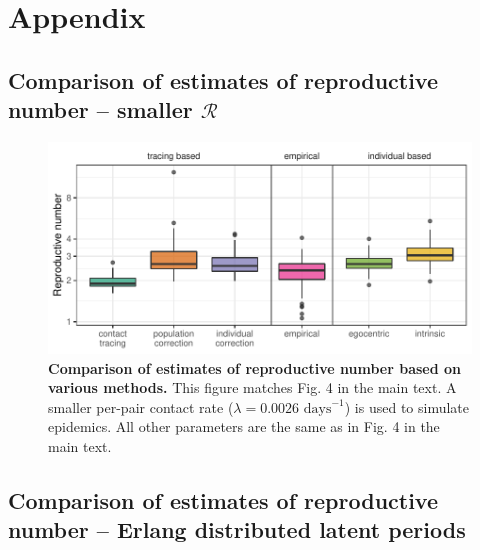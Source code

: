 \documentclass[12pt]{article}
\date{\today}
\newcommand{\RR}{\ensuremath{{\mathcal R}}}
\begin{document}
\appendix
\renewcommand\thefigure{\thesection.\arabic{figure}}
\setcounter{figure}{0}    
\section{Appendix}

\subsection{Comparison of estimates of reproductive number -- smaller $\RR$}

\begin{figure}[!h]
\includegraphics[width=\textwidth]{../fig/cmp_reproductive_small.pdf}
\caption{\textbf{Comparison of estimates of reproductive number based on various methods.}
This figure matches Fig. 4 in the main text.
A smaller per-pair contact rate ($\lambda = 0.0026 \textrm{ days}^{-1}$) is used to simulate epidemics.
All other parameters are the same as in Fig. 4 in the main text.
}
\label{fig:cmpsmall}
\end{figure}

\pagebreak

\subsection{Comparison of estimates of reproductive number -- Erlang distributed latent periods}
\end{document}
